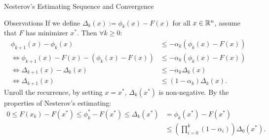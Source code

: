 \documentclass[11pt]{beamer}
\begin{document}
        \begin{frame}{Nesterov's Estimating Sequence and Convergence}
            \begin{block}{Observations}
                {\small
                If we define $\Delta_k(x) := \phi_k (x) - F(x)$ for all $x \in \mathbb R^n$, assume that $F$ has minimizer $x^*$. 
                Then $\forall k \ge 0$:  
                \begin{align*}
                    \phi_{k + 1}(x) - \phi_k(x) 
                    &\le - \alpha_k (\phi_k(x) - F(x))
                    \\
                    \iff 
                    \phi_{k + 1}(x) - F(x) - (\phi_k(x) - F(x))
                    &\le 
                    -\alpha_k(\phi_k(x) - F(x))
                    \\
                    \iff
                    \Delta_{k + 1}(x) - \Delta_k(x) &\le
                    - \alpha_k\Delta_k(x)
                    \\
                    \iff 
                    \Delta_{k + 1}(x) 
                    &\le 
                    (1 - \alpha_k)\Delta_k(x). 
                \end{align*}
                Unroll the recurrence, by setting $x = x^*$, $\Delta_k(x^*)$ is non-negative. By the properties of Nesterov's estimating: 
                \begin{align*}
                    0\le F(x_k) - F(x^*) \le \phi_k^* - F(x^*) \le \Delta_k(x^*) 
                    &= \phi_k(x^*) - F(x^*) 
                    \\
                    &\le \left(\prod_{i = 0}^k(1 - \alpha_i)\right)\Delta_0(x^*).
                \end{align*}
                }
            \end{block}
        \end{frame}
\end{document}
